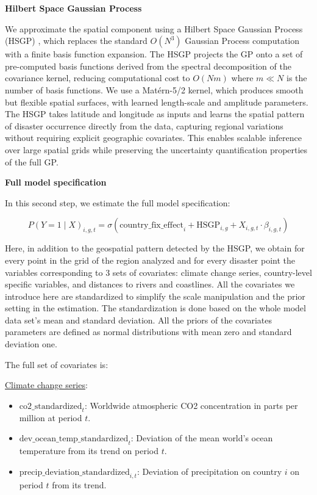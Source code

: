 \textbf{Hilbert Space Gaussian Process}

We approximate the spatial component using a Hilbert Space Gaussian Process (HSGP) \citep{solin2020hilbert}, which replaces the standard $O(N^3)$ Gaussian Process computation with a finite basis function expansion. The HSGP projects the GP onto a set of pre-computed basis functions derived from the spectral decomposition of the covariance kernel, reducing computational cost to $O(Nm)$ where $m \ll N$ is the number of basis functions. We use a Mat\'{e}rn-5/2 kernel, which produces smooth but flexible spatial surfaces, with learned length-scale and amplitude parameters. The HSGP takes latitude and longitude as inputs and learns the spatial pattern of disaster occurrence directly from the data, capturing regional variations without requiring explicit geographic covariates. This enables scalable inference over large spatial grids while preserving the uncertainty quantification properties of the full GP.

\textbf{Full model specification}

In this second step, we estimate the full model specification:

\begin{equation}
P(Y=1 \mid X)_{i,g,t} = \sigma\left( \text{country\_fix\_effect}_i + \text{HSGP}_{i,g} + X_{i,g,t} \cdot \beta_{i,g,t} \right)
\end{equation}

Here, in addition to the geospatial pattern detected by the HSGP, we obtain for every point in the grid of the region analyzed and for every disaster point the variables corresponding to 3 sets of covariates: climate change series, country-level specific variables, and distances to rivers and coastlines. All the covariates we introduce here are standardized to simplify the scale manipulation and the prior setting in the estimation. The standardization is done based on the whole model data set's mean and standard deviation. All the priors of the covariates parameters are defined as normal distributions with mean zero and standard deviation one.

The full set of covariates is:

\underline{Climate change series}:
\begin{itemize}
    \item $\text{co2\_standardized}_{t}$: Worldwide atmospheric CO2 concentration in parts per million at period $t$.
    \item $\text{dev\_ocean\_temp\_standardized}_t$: Deviation of the mean world's ocean temperature from its trend on period $t$.
    \item $\text{precip\_deviation\_standardized}_{i,t}$: Deviation of precipitation on country $i$ on period $t$ from its trend.
\end{itemize}

